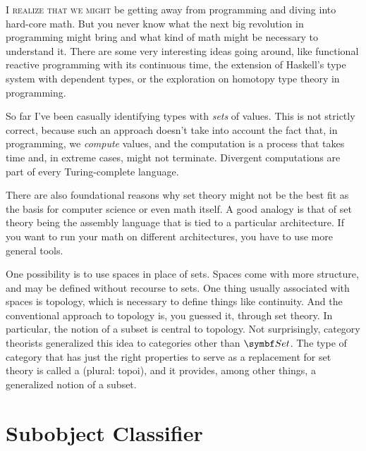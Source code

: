
\lettrine[lhang=0.17]{I}{ realize that we might} be getting away from programming and diving into
hard-core math. But you never know what the next big revolution in
programming might bring and what kind of math might be necessary to
understand it. There are some very interesting ideas going around, like
functional reactive programming with its continuous time, the extension
of Haskell's type system with dependent types, or the exploration on
homotopy type theory in programming.

So far I've been casually identifying types with \emph{sets} of values.
This is not strictly correct, because such an approach doesn't take into
account the fact that, in programming, we \emph{compute} values, and the
computation is a process that takes time and, in extreme cases, might
not terminate. Divergent computations are part of every Turing-complete
language.

There are also foundational reasons why set theory might not be the best
fit as the basis for computer science or even math itself. A good
analogy is that of set theory being the assembly language that is tied
to a particular architecture. If you want to run your math on different
architectures, you have to use more general tools.

One possibility is to use spaces in place of sets. Spaces come with more
structure, and may be defined without recourse to sets. One thing
usually associated with spaces is topology, which is necessary to define
things like continuity. And the conventional approach to topology is,
you guessed it, through set theory. In particular, the notion of a
subset is central to topology. Not surprisingly, category theorists
generalized this idea to categories other than $\Set$. The type of
category that has just the right properties to serve as a replacement
for set theory is called a  (plural: topoi), and it
provides, among other things, a generalized notion of a subset.

\section{Subobject Classifier}

